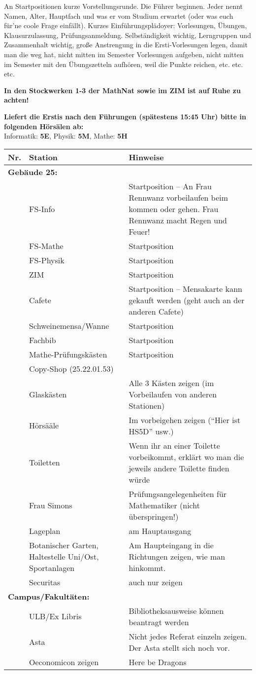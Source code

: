 \documentclass[a4paper,10pt]{article}
\newcounter{magicrownumbers}[page]
\newcommand\rownumber{\stepcounter{magicrownumbers}\arabic{magicrownumbers}}
\newcommand{\pretext}{An Startpositionen kurze Vorstellungsrunde. Die Führer beginnen. Jeder nennt Namen, Alter, Hauptfach
und was er vom Studium erwartet (oder was euch für'ne coole Frage einfällt). Kurzes
Einführungsplädoyer: Vorlesungen, Übungen, Klausurzulassung, Prüfungsanmeldung. Selbständigkeit
wichtig, Lerngruppen und Zusammenhalt wichtig, große
Anstrengung in die Ersti-Vorlesungen legen, damit man die weg hat, nicht mitten im Semester
Vorlesungen aufgeben, nicht mitten im Semester mit den Übungszetteln aufhören, weil die Punkte
reichen, etc. etc. etc.

\textbf{In den Stockwerken 1-3 der MathNat sowie im ZIM ist auf Ruhe zu achten!}

\textbf{Liefert die Erstis nach den Führungen (spätestens 15:45 Uhr) bitte in folgenden Hörsälen ab:}\\
Informatik: \textbf{5E}, Physik: \textbf{5M}, Mathe: \textbf{5H}\\}
\begin{document}
\pretext
\begin{tabularx}{\textwidth}{p{}p{}p{}}
  \textbf{Nr.} & \textbf{Station} & \textbf{Hinweise} \\
  \hline
  \multicolumn{3}{l}{\large{\textbf{Gebäude 25:}}} \\
  \rowcolor{cyan}
  \rownumber & FS-Info & Startposition -- An Frau Rennwanz vorbeilaufen beim kommen oder gehen. Frau
  Rennwanz macht Regen und Feuer! \\
  \rownumber & FS-Mathe & Startposition \\
  \rownumber & FS-Physik & Startposition \\
  \rownumber & ZIM & Startposition \\
  \rownumber & Cafete & Startposition -- Mensakarte kann gekauft werden (geht auch an der anderen Cafete)\\
  \rownumber & Schweinemensa/Wanne & Startposition \\
  \rownumber & Fachbib & Startposition \\
  \rownumber & Mathe-Prüfungskästen & Startposition \\
  \rownumber & Copy-Shop (25.22.01.53) & \\
  \rownumber & Glaskästen &  Alle 3 Kästen zeigen (im Vorbeilaufen von anderen Stationen)\\
  \rownumber & Hörsääle & Im vorbeigehen zeigen ("`Hier ist HS5D"' usw.) \\
  \rownumber & Toiletten & Wenn ihr an einer Toilette vorbeikommt, erklärt wo man
  die jeweils andere Toilette finden würde \\
  \rownumber & Frau Simons &  Prüfungsangelegenheiten für Mathematiker (nicht überspringen!) \\
  \rownumber & Lageplan  & am Hauptausgang \\
  \rownumber & Botanischer Garten, Haltestelle Uni/Ost, Sportanlagen & Am Haupteingang in die
  Richtungen zeigen, wie man hinkommt. \\
  \rownumber & Securitas & auch nur zeigen \\
  \hline
  \multicolumn{3}{l}{\large{\textbf{Campus/Fakultäten:}}} \\
  \rownumber & ULB/Ex Libris & Bibliotheksausweise können beantragt werden \\
  \rownumber & Asta & Nicht jedes Referat einzeln zeigen. Der Asta stellt sich noch vor.\\
  \rownumber & Oeconomicon zeigen & Here be Dragons\\

\end{tabularx}
\end{document}
